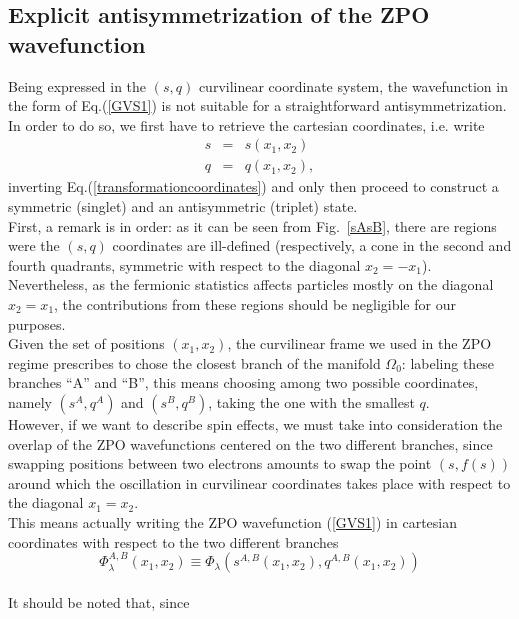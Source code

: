 \documentclass[aps,pra,twocolumn,superscriptaddress]{revtex4}
\begin{document}
\subsection{Explicit antisymmetrization of the ZPO wavefunction}\label{EXACT}
Being expressed in the $(s,q)$ curvilinear coordinate system, the wavefunction in the form of Eq.(\ref{GVS1}) is not suitable for a straightforward antisymmetrization. In order to do so, we first have to retrieve the cartesian coordinates, i.e. write
\begin{equation}
\begin{aligned}\label{curvcoordfromreal}
s&=&s\left(x_1,x_2\right)\\q&=&q\left(x_1,x_2\right),
\end{aligned} 
\end{equation}
inverting Eq.(\ref{transformationcoordinates}) and only then proceed to construct a symmetric (singlet) and an antisymmetric (triplet) state.
\\First, a remark is in order: as it can be seen from Fig.~\ref{sAsB}, there are regions were the $(s,q)$ coordinates are ill-defined (respectively, a cone in the second and fourth quadrants, symmetric with respect to the diagonal $x_2=-x_1$). Nevertheless, as the fermionic statistics affects particles mostly on the diagonal  $x_2=x_1$, the contributions from these regions should be negligible for our purposes.\\
Given the set of positions $(x_1,x_2)$, the curvilinear frame we used in the ZPO regime prescribes to chose the closest branch of the manifold $\Omega_0$: labeling these branches ``A'' and ``B'', this means choosing among two possible coordinates, namely $(s^A,q^A)$ and $(s^B,q^B)$, taking the one with the smallest $q$.\\However, if we want to describe spin effects, we must take into consideration the overlap of the ZPO wavefunctions centered on the two different branches, since swapping positions between two electrons amounts to swap the point $(s,f(s))$ around which the oscillation in curvilinear coordinates takes place with respect to the diagonal $x_1=x_2$.\\This means actually writing the ZPO wavefunction (\ref{GVS1}) in cartesian coordinates with respect to the two different branches
\begin{equation}\label{phiAphiB}
\Phi^{A,B}_{\lambda}(x_1,x_2)\equiv\Phi_{\lambda}\left(s^{A,B}(x_1,x_2),q^{A,B}(x_1,x_2)\right)
\end{equation}\\It should be noted that, since
\end{document}

